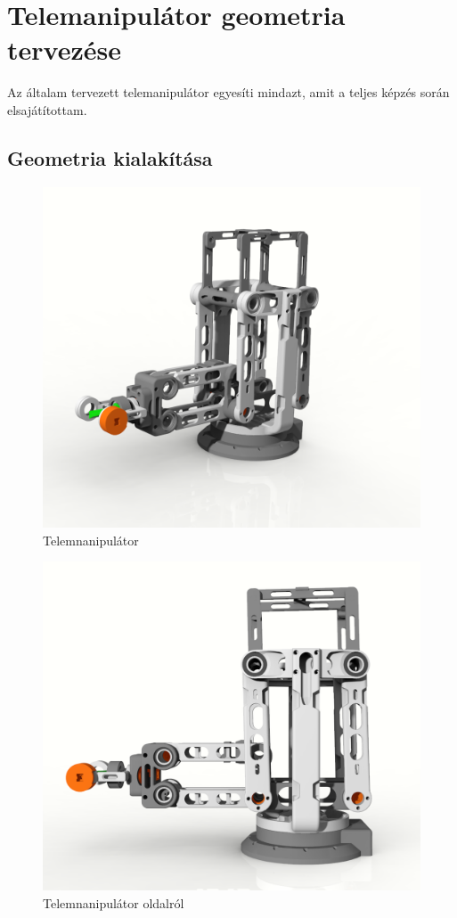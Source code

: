 \chapter{Telemanipulátor geometria tervezése}
\label{sec:geometria}

Az általam tervezett telemanipulátor egyesíti mindazt, amit a teljes képzés során elsajátítottam. 

\section{Geometria kialakítása}

\begin{figure}[!ht]
\centering
\includegraphics[width=120mm, keepaspectratio]{figures/Diploma_CAD/creo1.png}
\caption{Telemnanipulátor}
\label{fig:Telemnanipulátor}
\end{figure}

\begin{figure}[!ht]
\centering
\includegraphics[width=120mm, keepaspectratio]{figures/Diploma_CAD/creo2.png}
\caption{Telemnanipulátor oldalról}
\label{fig:Telemnanipulátor}
\end{figure}


